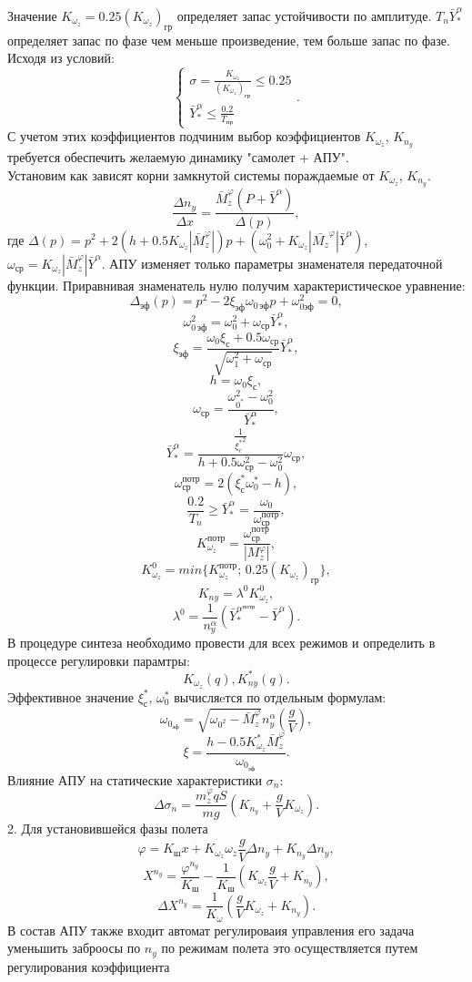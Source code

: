 \documentclass{article}
\begin{document}
Значение $K_{\omega_z} = 0.25(K_{\omega_z})_{гр}$ определяет запас устойчивости по амплитуде. $T_n \bar{Y}_*^\alpha$ определяет запас по фазе чем меньше произведение, тем больше запас по фазе.
Исходя из условий:
\[
\begin{cases}
\sigma = \frac{K_{\omega_z}}{(K_{\omega_z})_{гр}} \leq 0.25 \\
\bar{Y}_*^\alpha \leq \frac{0.2}{T_{пр}}
\end{cases}.
\]
С учетом этих коэффициентов подчиним выбор коэффициентов $K_{\omega_z}$, $K_{n_y}$ требуется обеспечить желаемую динамику "самолет + АПУ".\\
Установим как зависят корни замкнутой системы пораждаемые от $K_{\omega_z}$, $K_{n_y}$.
\[
\frac{\Delta n_y}{\Delta x} = \frac{\bar{M}_z^\varphi (P + \bar{Y}^\alpha)}{\Delta(p)},
\]
где $\Delta(p) = p^2 + 2(h+0.5 K_{\omega_z} |\bar{M}_z^\varphi|)p + (\omega_0^2 + K_{\omega_z}|\bar{M_z}^\varphi|\bar{Y}^\alpha)$, $\omega_{ср} = K_{\omega_z} |\bar{M}_z^\varphi| \bar{Y}^\alpha$.
АПУ изменяет только параметры знаменателя передаточной функции.
Приравнивая знаменатель нулю получим характеристическое уравнение:
\[
\Delta_{эф}(p)= p^2 - 2 \xi_{эф}\omega_{0 \, эф}p + \omega_{0 эф}^2 = 0, 
\]
\[
\omega_{0 \, эф}^2 = \omega_0^2 + \omega_{ср}\bar{Y}^\alpha_*,
\]
\[
\xi_{эф} = \frac{\omega_0 \xi_с +0.5\omega_{ср}}{\sqrt{\omega_1^2 + \omega_{ср}}} \bar{Y}^{\alpha}_* ,
\]
\[
h = \omega_0 \xi_с,
\]
\[
\omega_{ср}= \frac{\omega_{0^*}^2 - \omega_0^2}{\bar{Y}^{\alpha}_*},
\]
\[
\bar{Y}^{\alpha}_* = \frac{\frac{1}{{\xi_c^*}^2}}{h + 0.5 \omega_{ср}^2- \omega_0^2}{\omega_{ср}},
\]
\[
\omega_{ср}^{потр} = 2(\xi_с^* \omega_0^* - h),
\]
\[
\frac{0.2}{T_n} \geq \bar{Y}^{\alpha}_* = \frac{\omega_0}{\omega_{ср}^{потр}},
\]
\[
K_{\omega_z}^{потр} = \frac{\omega_{ср}^{потр}}{|M_z^{\varphi}|},
\]
\[
K_{\omega_z}^0 = min\{K_{\omega_z}^{потр}; \, 0.25(K_{\omega_z})_{гр}\},
\]
\[
K_{ny}= \lambda^0 K^0_{\omega_z},
\]
\[
\lambda^0 = \frac{1}{n_y^\alpha}(\bar{Y}^{\alpha^{потр}}_* - \bar{Y}^\alpha).
\]
В процедуре синтеза необходимо провести для всех режимов и определить в процессе регулировки парамтры:
\[
K_{\omega_z}(q), K_{ny}^*(q).
\]
Эффективное значение $\xi_с^*$, $\omega_0^*$ вычисляeтся по отдельным формулам:
\[
\omega_{0_{эф}} = \sqrt{\omega_{0^{2}} -\bar{M}_z^{\varphi}} n_y^{\alpha}(\frac{g}{V}),
\]
\[
\xi = \frac{h - 0.5 K_{\omega_z}^* \bar{M}_z^{\varphi}}{\omega_{0_{эф}}}.
\]
Влияние АПУ на статические характеристики $\sigma_n$:
\[
\Delta \sigma_n = \frac{m_z^\varphi q S}{mg}(K_{n_y} + \frac{g}{V}K_{\omega_z}).
\]
2. Для установившейся фазы полета 
\[
\varphi = K_{ш}x + K_{\omega_z} \omega_z \frac{g}{V}\Delta n_y + K_{n_y} \Delta n_y,
\]
\[
X^{n_y} = \frac{\varphi^{n_y}}{K_ш} - \frac{1}{K_{ш}} (K_{\omega_z} \frac{g}{V} + K_{n_y}),
\]
\[
\Delta X^{n_y}= \frac{1}{K_\omega} (\frac{g}{V} K_{\omega_z}+ K_{n_y}).
\]
В состав АПУ также входит автомат регулироваия управления его задача уменьшить заброосы по $n_y$ по режимам полета это осуществляется путем регулирования коэффициента 
\end{document}
